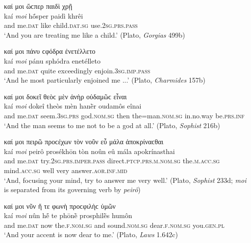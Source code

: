 \begin{exe}
\ex καί μοι ὥϲπερ παιδὶ χρῇ\\
\gll kaí \emph{moi} hṓsper paidì khrêi\\
and me.\textsc{dat} like child.\textsc{dat.sg} use.\textsc{2sg.prs.pass}\\
\trans `And you are treating me like a child.' (Plato, \textit{Gorgias} 499b)
\label{kaimoi51}
\end{exe}

\begin{exe}
\ex καί μοι πάνυ ϲφόδρα ἐνετέλλετο\\
\gll kaí \emph{moi} pánu sphódra enetélleto\\
and me.\textsc{dat} quite exceedingly enjoin.\textsc{3sg.imp.pass}\\
\trans `And he most particularly enjoined me ...' (Plato, \textit{Charmides} 157b)
\label{kaimoi52}
\end{exe}

\begin{exe}
\ex καί μοι δοκεῖ θεὸϲ μὲν ἁνὴρ οὐδαμῶϲ εἶναι\\
\gll kaí \emph{moi} dokeî theòs mèn hanḕr oudamôs eînai\\
and me.\textsc{dat} seem.\textsc{3sg.prs} god.\textsc{nom.sg} then the=man.\textsc{nom.sg} in.no.way be.\textsc{prs.inf}\\
\trans `And the man seems to me not to be a god at all.' (Plato, \textit{Sophist} 216b)
\label{kaimoi53}
\end{exe}

\begin{exe}
\ex καί μοι πειρῶ προϲέχων τὸν νοῦν εὖ μάλα ἀποκρίναϲθαι\\
\gll kaí \emph{moi} peirô prosékhōn tòn noûn eû mála apokrínasthai\\
and me.\textsc{dat} try.\textsc{2sg.prs.imper.pass}
direct.\textsc{ptcp.prs.m.nom.sg} the.\textsc{m.acc.sg} mind.\textsc{acc.sg} well very answer.\textsc{aor.inf.mid}\\
\trans `And, focusing your mind, try to answer me very well.' (Plato, \textit{Sophist} 233d; \textit{moi} is separated from its governing verb by \textit{peirô})
\label{kaimoi54}
\end{exe}

\begin{exe}
\ex καί μοι νῦν ἥ τε φωνὴ προϲφιλὴϲ ὑμῶν\\
\gll kaí \emph{moi} nûn hḗ te phōnḕ prosphilḕs humôn\\
and me.\textsc{dat} now the.\textsc{f.nom.sg} and
sound.\textsc{nom.sg} dear.\textsc{f.nom.sg} you.\textsc{gen.pl}\\
\trans `And your accent is now dear to me.' (Plato, \textit{Laws} 1.642c)
\label{kaimoi55}
\end{exe}


